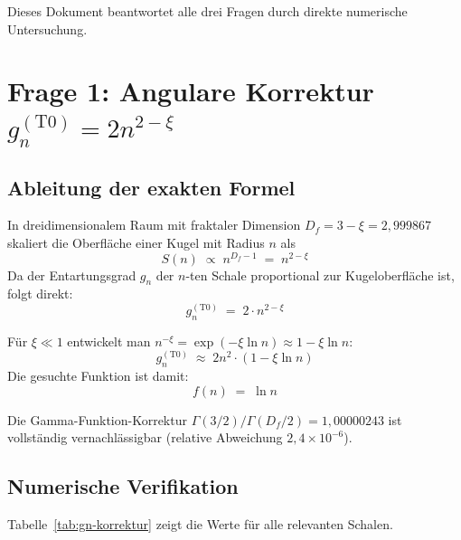 Dieses Dokument beantwortet alle drei Fragen durch direkte numerische
Untersuchung.

\section{Frage 1: Angulare Korrektur \texorpdfstring{$g_n^{(\mathrm{T0})} = 2n^{2-\xi}$}{}}
\label{sec:angulare-korrektur}

\subsection{Ableitung der exakten Formel}
\label{subsec:ableitung-gn}

In dreidimensionalem Raum mit fraktaler Dimension
$D_f = 3 - \xi = 2{,}999867$ skaliert die Oberfläche einer Kugel
mit Radius $n$ als
\begin{equation}
  S(n) \;\propto\; n^{D_f - 1} \;=\; n^{2 - \xi}
\end{equation}
Da der Entartungsgrad $g_n$ der $n$-ten Schale proportional zur
Kugeloberfläche ist, folgt direkt:
\begin{equation}
  \boxed{g_n^{(\mathrm{T0})} \;=\; 2 \cdot n^{2-\xi}}
  \label{eq:gn-T0}
\end{equation}

Für $\xi \ll 1$ entwickelt man $n^{-\xi} = \exp(-\xi \ln n) \approx 1 - \xi \ln n$:
\begin{equation}
  g_n^{(\mathrm{T0})} \;\approx\; 2n^2 \cdot (1 - \xi \ln n)
  \label{eq:gn-approx}
\end{equation}
Die gesuchte Funktion ist damit:
\begin{equation}
  f(n) \;=\; \ln n
\end{equation}

Die Gamma-Funktion-Korrektur $\Gamma(3/2)/\Gamma(D_f/2) = 1{,}00000243$
ist vollständig vernachlässigbar (relative Abweichung $2{,}4 \times 10^{-6}$).

\subsection{Numerische Verifikation}
\label{subsec:numerik-gn}

Tabelle~\ref{tab:gn-korrektur} zeigt die Werte für alle relevanten Schalen.

